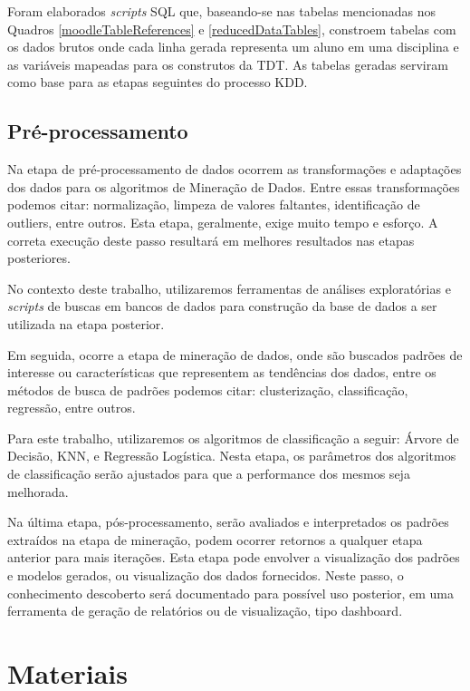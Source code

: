 Foram elaborados \textit{scripts} SQL que, baseando-se nas tabelas mencionadas
nos Quadros \ref{moodleTableReferences} e \ref{reducedDataTables}, constroem
tabelas com os dados brutos onde cada linha gerada representa um aluno em uma
disciplina e as variáveis mapeadas para os construtos da TDT. As tabelas geradas
serviram como base para as etapas seguintes do processo KDD.

\subsection{Pré-processamento}

Na etapa de pré-processamento de dados ocorrem as transformações e adaptações
dos dados para os algoritmos de Mineração de Dados. Entre essas transformações
podemos citar: normalização, limpeza de valores faltantes, identificação de
outliers, entre outros. Esta etapa, geralmente, exige muito tempo e esforço. A
correta execução deste passo resultará em melhores resultados nas etapas
posteriores.

No contexto deste trabalho, utilizaremos ferramentas de análises exploratórias e
\textit{scripts} de buscas em bancos de dados para construção da base de dados a
ser utilizada na etapa posterior.

Em seguida, ocorre a etapa de mineração de dados, onde são buscados padrões de
interesse ou características que representem as tendências dos dados, entre os
métodos de busca de padrões podemos citar: clusterização, classificação,
regressão, entre outros.

Para este trabalho, utilizaremos os algoritmos de classificação a seguir: Árvore
de Decisão, KNN, e Regressão Logística. Nesta etapa, os parâmetros dos
algoritmos de classificação serão ajustados para que a performance dos mesmos
seja melhorada.

Na última etapa, pós-processamento, serão avaliados e interpretados os padrões
extraídos na etapa de mineração, podem ocorrer retornos a qualquer etapa
anterior para mais iterações. Esta etapa pode envolver a visualização dos
padrões e modelos gerados, ou visualização dos dados fornecidos. Neste passo, o
conhecimento descoberto será documentado para possível uso posterior, em uma
ferramenta de geração de relatórios ou de visualização, tipo dashboard.

\section{Materiais}


